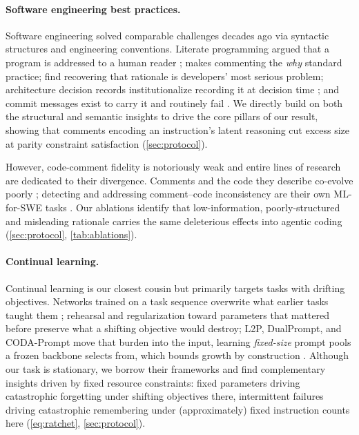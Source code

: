 \paragraph{Software engineering best practices.}
Software engineering solved comparable challenges decades ago via syntactic structures and engineering
conventions. Literate programming argued that a program is addressed to a human reader \citep{knuth1984literate};
\citet{mcconnell2004codecomplete} makes commenting the \emph{why} standard practice;
\citet{latoza2006mentalmodels} find recovering that rationale is developers' most serious problem;
architecture decision records institutionalize recording it at decision time \citep{nygard2011adr}; and
commit messages exist to carry it and routinely fail \citep{tian2022commitmessages}. We directly build on
both the structural and semantic insights to drive the core pillars of our result, showing that comments
encoding an instruction's latent reasoning cut excess size at parity constraint satisfaction (\autoref{sec:protocol}).

However, code-comment fidelity is notoriously weak and entire lines of research are dedicated to their
divergence. Comments and the code they describe co-evolve poorly \citep{fluri2007coevolution}; detecting and
addressing comment--code inconsistency are their own ML-for-SWE tasks \citep{panthaplackel2020comments,
panthaplackel2021jit}. Our ablations identify that low-information, poorly-structured and misleading
rationale carries the same deleterious effects into agentic coding (\autoref{sec:protocol},
\autoref{tab:ablations}).

\paragraph{Continual learning.}
Continual learning is our closest cousin but primarily targets tasks with drifting objectives. Networks
trained on a task sequence overwrite what earlier tasks taught them \citep{mccloskey1989catastrophic,
french1999catastrophic}; rehearsal and regularization toward parameters that mattered before
\citep{kirkpatrick2017overcoming} preserve what a shifting objective would destroy; L2P, DualPrompt, and
CODA-Prompt move that burden into the input, learning \emph{fixed-size} prompt pools a frozen backbone
selects from, which bounds growth by construction \citep{wang2022l2p, wang2022dualprompt, smith2023coda}.
Although our task is stationary, we borrow their frameworks and find complementary insights driven by fixed
resource constraints: fixed parameters driving catastrophic forgetting under shifting objectives there,
intermittent failures driving catastrophic remembering under (approximately) fixed instruction counts here
(\autoref{eq:ratchet}, \autoref{sec:protocol}).

